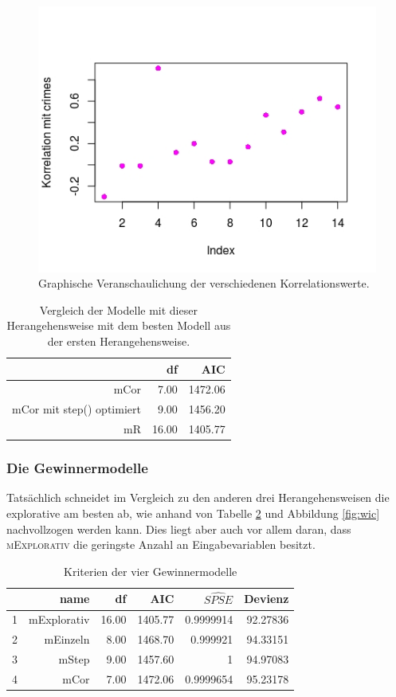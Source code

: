\begin{figure}
\centering
\includegraphics[scale=.7]{./jpgs/corc.jpeg}
\caption{Graphische Veranschaulichung der verschiedenen Korrelationswerte.}
\label{fig:cor}
\end{figure} 

\begin{table}[ht]
\centering
\begin{tabular}{rrr}
  \hline
 & df & AIC \\ 
  \hline
mCor & 7.00 & 1472.06 \\ 
  mCor mit step() optimiert & 9.00 & 1456.20 \\ 
  mR & 16.00 & 1405.77 \\ 
   \hline
\end{tabular}
\caption{Vergleich der Modelle mit dieser Herangehensweise mit dem besten Modell aus der ersten Herangehensweise.}
\label{tab:co2}
\end{table}

\subsubsection{Die Gewinnermodelle}
Tats\"achlich schneidet im Vergleich zu den anderen drei Herangehensweisen die explorative am besten ab, wie anhand von Tabelle \ref{tab:wic} und Abbildung \ref{fig:wic} nachvollzogen werden kann.
Dies liegt aber auch vor allem daran, dass \textsc{mExplorativ} die geringste Anzahl an Eingabevariablen besitzt.

\begin{table}[ht]
\centering
\begin{tabular}{rrrrrr}
  \hline
  & name & df & AIC & $\hat{SPSE}$ & Devienz  \\ 
  \hline
	1 & mExplorativ & 16.00 & 1405.77 & 0.9999914 & 92.27836 \\ 
	2 & mEinzeln & 8.00 & 1468.70 &  0.999921 & 94.33151\\   
  	3 & mStep & 9.00 & 1457.60 &  1 & 94.97083\\ 
    4 & mCor & 7.00 & 1472.06 &  0.9999654 & 95.23178\\ 
   \hline
\end{tabular}
\caption{Kriterien der vier Gewinnermodelle}
\label{tab:wic}
\end{table}

